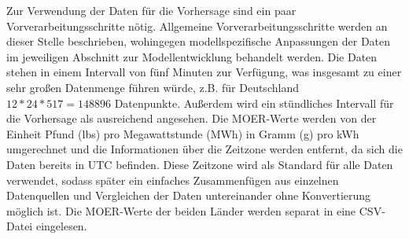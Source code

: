 Zur Verwendung der Daten für die Vorhersage sind ein paar Vorverarbeitungsschritte nötig.
Allgemeine Vorverarbeitungsschritte werden an dieser Stelle beschrieben, wohingegen modellspezifische Anpassungen der Daten im jeweiligen Abschnitt zur Modellentwicklung behandelt werden.
Die Daten stehen in einem Intervall von fünf Minuten zur Verfügung, was insgesamt zu einer sehr großen Datenmenge führen würde, z.B. für Deutschland $12 * 24 * 517 = 148 896$ Datenpunkte.
Außerdem wird ein stündliches Intervall für die Vorhersage als ausreichend angesehen.
Die \ac{MOER}-Werte werden von der Einheit Pfund (lbs) pro Megawattstunde (MWh) in Gramm (g) pro \ac{kWh} umgerechnet und die Informationen über die Zeitzone werden entfernt, da sich die Daten bereits in \ac{UTC} befinden.
Diese Zeitzone wird als Standard für alle Daten verwendet, sodass später ein einfaches Zusammenfügen aus einzelnen Datenquellen und Vergleichen der Daten untereinander ohne Konvertierung möglich ist.
Die \ac{MOER}-Werte der beiden Länder werden separat in eine CSV-Datei eingelesen.

